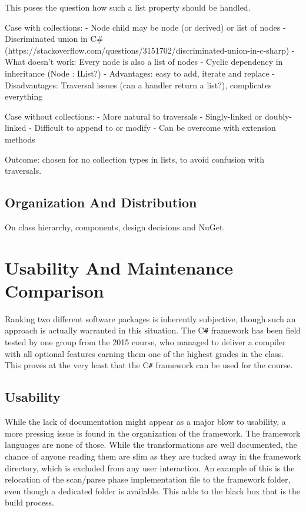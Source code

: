 \documentclass[twoside,openright]{uva-bachelor-thesis}
\newcommand{\cs}{C\texttt{\#}\xspace}
\begin{document}
		This poses the question how such a list property should be handled. 
		
		Case with collections:
		- Node child may be node (or derived) or list of nodes
		- Discriminated union in C\# (https://stackoverflow.com/questions/3151702/discriminated-union-in-c-sharp)
		- What doesn't work: Every node is also a list of nodes
		- Cyclic dependency in inheritance (Node : IList?)
		- Advantages: easy to add, iterate and replace
		- Disadvantages: Traversal issues (can a handler return a list?), complicates everything
		
		Case without collections:
		- More natural to traversals
		- Singly-linked or doubly-linked
		- Difficult to append to or modify
		- Can be overcome with extension methods
		
		Outcome: chosen for no collection types in lists, to avoid confusion with traversals.
	
	\section{Organization And Distribution}
	\label{package}
		On class hierarchy, components, design decisions and NuGet.
	

\chapter{Usability And Maintenance Comparison}
	Ranking two different software packages is inherently subjective, though such an approach is actually warranted in this situation. The \cs framework has been field tested by one group from the 2015 course, who managed to deliver a compiler with all optional features earning them one of the highest grades in the class. This proves at the very least that the \cs framework can be used for the course.
	
	\section{Usability}
		While the lack of documentation might appear as a major blow to usability, a more pressing issue is found in the organization of the framework. The framework languages are none of those. While the transformations are well documented, the chance of anyone reading them are slim as they are tucked away in the framework directory, which is excluded from any user interaction. An example of this is the relocation of the scan/parse phase implementation file to the framework folder, even though a dedicated folder is available. This adds to the black box that is the build process.
		
\end{document}

